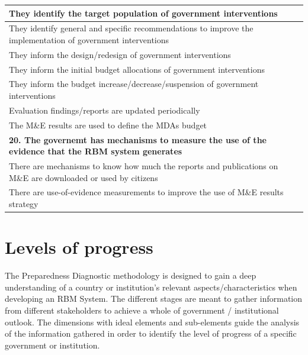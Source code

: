 \documentclass[
  10pt,
]{book}
\begin{document}
\begin{table}
\begin{tabular}[t]{l}
\hline
\hspace{1em}They identify the target population of government interventions\\
\hline
\hspace{1em}They identify general and specific recommendations to improve the implementation of government interventions\\
\hline
\hspace{1em}They inform the design/redesign of government interventions\\
\hline
\hspace{1em}They inform the initial budget allocations of government interventions\\
\hline
\hspace{1em}They inform the budget increase/decrease/suspension of government interventions\\
\hline
\hspace{1em}Evaluation findings/reports are updated periodically\\
\hline
\hspace{1em}The M\&E results are used to define the MDAs budget\\
\hline
\multicolumn{1}{l}{\textbf{20. The governemt has mechanisms to measure the use of the evidence that the RBM system generates}}\\
\hline
\hspace{1em}There are mechanisms to know how much the reports and publications on M\&E are downloaded or used by citizens\\
\hline
\hspace{1em}There are use-of-evidence measurements to improve the use of M\&E results strategy\\
\hline
\end{tabular}
\end{table}

\hypertarget{levels-of-progress}{%
\section{Levels of progress}\label{levels-of-progress}}

The Preparedness Diagnostic methodology is designed to gain a deep understanding of a country or institution's relevant aspects/characteristics when developing an RBM System. The different stages are meant to gather information from different stakeholders to achieve a whole of government / institutional outlook. The dimensions with ideal elements and sub-elements guide the analysis of the information gathered in order to identify the level of progress of a specific government or institution.
\end{document}
